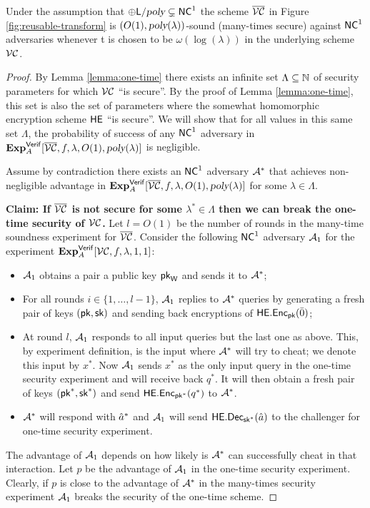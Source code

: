 \begin{theorem}
Under the assumption that $\oplus {\ensuremath{\mathsf{L}}} / {\textsl{poly}} \subsetneq {\ensuremath{\mathsf{NC}}}^1$ the scheme $\overline{{\cal VC}}$ in Figure \ref{fig:reusable-transform} is $(O(1),{\textsl{poly}}(\lambda))$-sound (many-times secure) against ${\mathsf{NC}}^1$ adversaries whenever t is chosen to be  $\omega(\log(\lambda))$ in the underlying scheme ${\cal VC}$. 
\end{theorem}
\begin{proof}
By Lemma \ref{lemma:one-time} there exists an infinite set $\Lambda \subseteq \mathbb{N}$ of security parameters for which ${\cal VC}$ ``is secure''.
By the proof of Lemma \ref{lemma:one-time}, this set is also the set of parameters where the somewhat homomorphic encryption scheme $\mathsf{HE}$ ``is secure''.
We will show that for all values in this same set $\Lambda$, the probability of success of any  ${\mathsf{NC}}^1$ adversary in ${\bf Exp}^{\mathsf{Verif}}_{A}[\overline{{\cal VC}}, f, \lambda, O(1), {\textsl{poly}}(\lambda)]$ is negligible. 

Assume by contradiction there exists an ${\mathsf{NC}}^1$ adversary $\mathcal{A}^*$ that achieves non-negligible advantage in ${\bf Exp}^{\mathsf{Verif}}_{A}[\overline{{\cal VC}}, f, \lambda, O(1), {\textsl{poly}}(\lambda)]$ for some $\lambda \in \Lambda$.

\textbf{Claim: If $\overline{{\cal VC}}$ is not secure for some $\lambda^* \in \Lambda$ then we can break the one-time security of ${\cal VC}$.}
Let $l = O(1)$ be the number of rounds in the many-time soundness experiment for $\overline{{\cal VC}}$. Consider the following ${\mathsf{NC}}^1$ adversary  $\mathcal{A}_1$ for the experiment ${\bf Exp}^{\mathsf{Verif}}_{A}[{\cal VC}, f, \lambda, 1,1]$:
\begin{itemize}
\item $\mathcal{A}_1$ obtains a pair a public key $\mathsf{pk}_{\mathsf{W}}$ and sends it to $\mathcal{A}^*$;
\item For all rounds $i \in \{1,\dots,l-1 \}$, $\mathcal{A}_1$ replies to
$\mathcal{A}^*$ queries by generating a fresh pair of keys $(\mathsf{pk}, \mathsf{sk})$ and sending back encryptions of $\mathsf{HE.Enc}_{\mathsf{pk}}(\bar{0})$;
\item At round $l$, $\mathcal{A}_1$ responds to all input queries but the last one as above. This, by experiment definition,  is the input where $\mathcal{A}^*$ will try to cheat; we denote this input by $x^*$. Now $\mathcal{A}_1$ sends $x^*$ as the only input query in the one-time security experiment and will receive back $q^*$. It will then obtain a fresh pair of keys $(\mathsf{pk}^*, \mathsf{sk}^*)$ and send $\mathsf{HE.Enc}_{\mathsf{pk}^*}(q^*)$ to $\mathcal{A}^*$.
\item $\mathcal{A}^*$ will respond with $\hat{a}^*$ and $\mathcal{A}_1$ will send $\mathsf{HE.Dec}_{\mathsf{sk}^*}(\hat{a})$ to the challenger for one-time security experiment.
\end{itemize}

The advantage of $\mathcal{A}_1$ depends on how likely is  $\mathcal{A}^*$ can successfully cheat in that interaction. Let $p$ be the advantage of $\mathcal{A}_1$ in the one-time security experiment. Clearly, if $p$ is close to the advantage of $\mathcal{A}^*$ in the many-times security experiment $\mathcal{A}_1$ breaks the security of the one-time scheme.


\end{proof}
